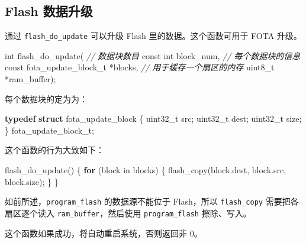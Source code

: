 \documentclass[
  12pt,
]{book}
\newenvironment{Shaded}{\begin{snugshade}}{\end{snugshade}}
\newcommand{\CommentTok}[1]{\textcolor[rgb]{0.56,0.35,0.01}{\textit{#1}}}
\newcommand{\ControlFlowTok}[1]{\textcolor[rgb]{0.13,0.29,0.53}{\textbf{#1}}}
\newcommand{\DataTypeTok}[1]{\textcolor[rgb]{0.13,0.29,0.53}{#1}}
\newcommand{\KeywordTok}[1]{\textcolor[rgb]{0.13,0.29,0.53}{\textbf{#1}}}
\newcommand{\NormalTok}[1]{#1}
\begin{document}
\hypertarget{flash-ux6570ux636eux5347ux7ea7}{%
\subsection{Flash 数据升级}\label{flash-ux6570ux636eux5347ux7ea7}}

通过 \texttt{flash\_do\_update} 可以升级 Flash 里的数据。这个函数可用于 FOTA 升级。

\begin{Shaded}
\begin{Highlighting}[]
\DataTypeTok{int}\NormalTok{ flash_do_update(}
    \CommentTok{// 数据块数目}
    \DataTypeTok{const} \DataTypeTok{int}\NormalTok{ block_num,}
    \CommentTok{// 每个数据块的信息}
    \DataTypeTok{const}\NormalTok{ fota_update_block_t *blocks,}
    \CommentTok{// 用于缓存一个扇区的内存}
    \DataTypeTok{uint8_t}\NormalTok{ *ram_buffer);}
\end{Highlighting}
\end{Shaded}

每个数据块的定为为：

\begin{Shaded}
\begin{Highlighting}[]
\KeywordTok{typedef} \KeywordTok{struct}\NormalTok{ fota_update_block}
\NormalTok{\{}
    \DataTypeTok{uint32_t}\NormalTok{ src;}
    \DataTypeTok{uint32_t}\NormalTok{ dest;}
    \DataTypeTok{uint32_t}\NormalTok{ size;}
\NormalTok{\} fota_update_block_t;}
\end{Highlighting}
\end{Shaded}

这个函数的行为大致如下：

\begin{Shaded}
\begin{Highlighting}[]
\NormalTok{flash_do_update() \{}
    \ControlFlowTok{for}\NormalTok{ (block in blocks) \{}
\NormalTok{        flash_copy(block.dest,}
\NormalTok{                   block.src,}
\NormalTok{                   block.size);}
\NormalTok{    \}}
\NormalTok{\}}
\end{Highlighting}
\end{Shaded}

如前所述，\texttt{program\_flash} 的数据源不能位于 Flash，所以 \texttt{flash\_copy} 需要把各扇区逐个读入
\texttt{ram\_buffer}，然后使用 \texttt{program\_flash} 擦除、写入。

这个函数如果成功，将自动重启系统，否则返回非 0。

  

\backmatter
\printindex
\end{document}
